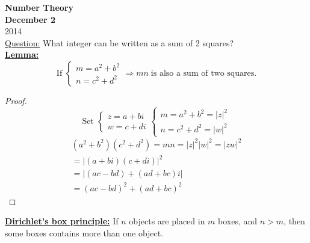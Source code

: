 \documentclass{report}
\begin{document}
{\centering
\Large
\textbf{Number Theory}\\
\normalsize
\textbf{December 2}\\
2014\\
}
\vspace{10mm}
\underline{Question:} What integer can be written as a sum of 2 squares?\\
\underline{\textbf{Lemma:}} \[\text{If  }\left\{
																					\begin{array}{lcl}
																					m=a^2+b^2\\
																					n=c^2+d^2
																					\end{array}
																					\right. \Rightarrow mn \;\text{is also a sum of two squares.}\]
\begin{proof} \[\text{Set  }\left\{
														\begin{array}{lcl}
														z=a+bi\\
														w=c+di
														\end{array}
														\right.
														\left\{
														\begin{array}{lcl}
														m=a^2+b^2=|z|^2\\
														n=c^2+d^2=|w|^2
														\end{array}
														\right.
							\]							
							\[\begin{array}{lcl}
								(a^2+b^2)(c^2+d^2)=mn=|z|^2|w|^2=|zw|^2\\
								=|(a+bi)(c+di)|^2\\
								=|(ac-bd)+(ad+bc)i|\\
								=(ac-bd)^2+(ad+bc)^2
								\end{array}
							\]
\end{proof}
\underline{\textbf{Dirichlet's box principle:}} If $n$ objects are placed in $m$ boxes, and $n>m$, then some boxes contains more than one object.\\
\end{document}
